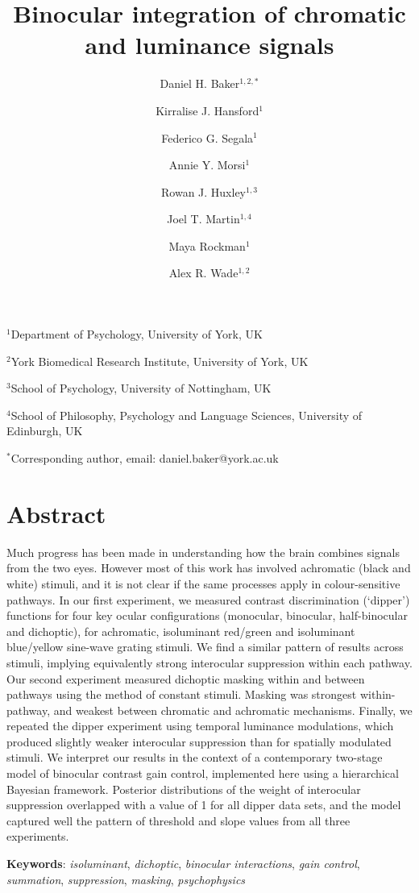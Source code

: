 \documentclass[
  letterpaper,
  DIV=11,
  numbers=noendperiod]{scrartcl}
\title{Binocular integration of chromatic and luminance signals}
\author{Daniel H. Baker\(^{1,2,*}\) \and Kirralise J.
Hansford\(^1\) \and Federico G. Segala\(^1\) \and Annie Y.
Morsi\(^1\) \and Rowan J. Huxley\(^{1,3}\) \and Joel T.
Martin\(^{1,4}\) \and Maya Rockman\(^1\) \and Alex R. Wade\(^{1,2}\)}
\date{}
\begin{document}
\maketitle
\(^1\)Department of Psychology, University of York, UK

\(^2\)York Biomedical Research Institute, University of York, UK

\(^3\)School of Psychology, University of Nottingham, UK

\(^4\)School of Philosophy, Psychology and Language Sciences, University
of Edinburgh, UK

\(^*\)Corresponding author, email: daniel.baker@york.ac.uk

\hypertarget{abstract}{%
\section{Abstract}\label{abstract}}

Much progress has been made in understanding how the brain combines
signals from the two eyes. However most of this work has involved
achromatic (black and white) stimuli, and it is not clear if the same
processes apply in colour-sensitive pathways. In our first experiment,
we measured contrast discrimination (`dipper') functions for four key
ocular configurations (monocular, binocular, half-binocular and
dichoptic), for achromatic, isoluminant red/green and isoluminant
blue/yellow sine-wave grating stimuli. We find a similar pattern of
results across stimuli, implying equivalently strong interocular
suppression within each pathway. Our second experiment measured
dichoptic masking within and between pathways using the method of
constant stimuli. Masking was strongest within-pathway, and weakest
between chromatic and achromatic mechanisms. Finally, we repeated the
dipper experiment using temporal luminance modulations, which produced
slightly weaker interocular suppression than for spatially modulated
stimuli. We interpret our results in the context of a contemporary
two-stage model of binocular contrast gain control, implemented here
using a hierarchical Bayesian framework. Posterior distributions of the
weight of interocular suppression overlapped with a value of 1 for all
dipper data sets, and the model captured well the pattern of threshold
and slope values from all three experiments.

\textbf{Keywords}: \emph{isoluminant}, \emph{dichoptic}, \emph{binocular
interactions}, \emph{gain control}, \emph{summation},
\emph{suppression}, \emph{masking}, \emph{psychophysics}
\end{document}
